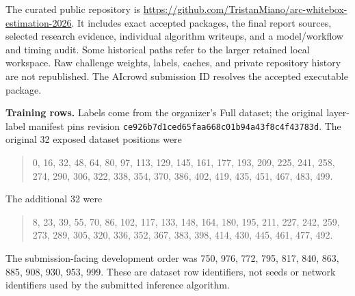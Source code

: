 The curated public repository is
\url{https://github.com/TristanMiano/arc-whitebox-estimation-2026}.
It includes exact accepted packages, the final report sources, selected
research evidence, individual algorithm writeups, and a model/workflow and
timing audit. Some historical paths refer to the larger retained local
workspace. Raw challenge weights, labels, caches, and private repository
history are not republished. The AIcrowd submission ID resolves the accepted
executable package.

\textbf{Training rows.} Labels come from the organizer's
 Full dataset; the original layer-label
manifest pins revision \texttt{ce926b7d1ced65faa668c01b94a43f8c4f43783d}.
The original 32 exposed dataset positions were
\begin{quote}\small
0, 16, 32, 48, 64, 80, 97, 113, 129, 145, 161, 177, 193, 209, 225, 241,
258, 274, 290, 306, 322, 338, 354, 370, 386, 402, 419, 435, 451, 467, 483, 499.
\end{quote}
The additional 32 were
\begin{quote}\small
8, 23, 39, 55, 70, 86, 102, 117, 133, 148, 164, 180, 195, 211, 227, 242,
259, 273, 289, 305, 320, 336, 352, 367, 383, 398, 414, 430, 445, 461, 477, 492.
\end{quote}
The submission-facing development order was 750, 976, 772, 795, 817, 840,
863, 885, 908, 930, 953, 999. These are dataset row identifiers, not seeds or
network identifiers used by the submitted inference algorithm.
